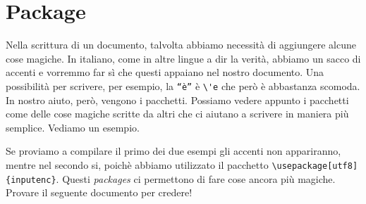 \section{Package}
Nella scrittura di un documento, talvolta abbiamo necessità di aggiungere 
alcune cose magiche. In italiano, come in altre lingue a dir la verità, 
abbiamo un sacco di accenti e vorremmo far sì che questi appaiano nel nostro 
documento. Una possibilità per scrivere, per esempio, la \texttt{``è''} è 
\verb!\'e! che però è abbastanza scomoda. In nostro aiuto, però, vengono i 
pacchetti. Possiamo vedere appunto i pacchetti come delle cose magiche scritte 
da altri che ci aiutano a scrivere in maniera più semplice. Vediamo un esempio.


Se proviamo a compilare il primo dei due esempi gli accenti non appariranno, 
mentre nel secondo si, poichè abbiamo utilizzato il pacchetto 
\verb!\usepackage[utf8]{inputenc}!. Questi \textit{packages} ci permettono di 
fare cose ancora più magiche. Provare il seguente documento per credere!
